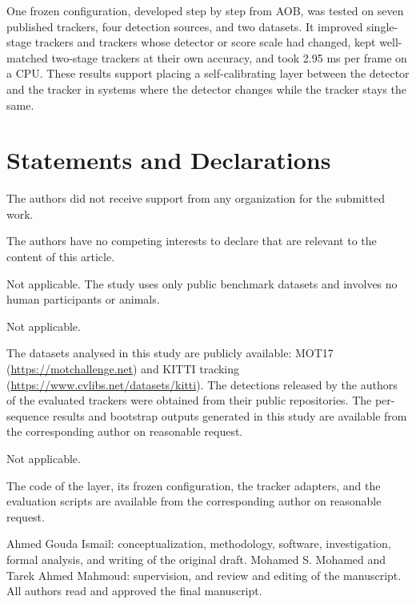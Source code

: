 \documentclass[pdflatex,referee,sn-mathphys-num]{sn-jnl}
\newcommand{\aob}{AOB}
\begin{document}
One frozen configuration, developed step by step from \aob{}, was tested on
seven published trackers, four detection sources, and two datasets. It
improved single-stage trackers and trackers whose detector or score scale had
changed, kept well-matched two-stage trackers at their own accuracy, and took
2.95 ms per frame on a CPU. These results support placing a self-calibrating
layer between the detector and the tracker in systems where the detector
changes while the tracker stays the same.

\backmatter

\section*{Statements and Declarations}

The authors did not receive support from any organization for the submitted work.

The authors have no competing interests to declare that are relevant to the content of this
article.

Not applicable. The study uses only public benchmark datasets and involves no human participants
or animals.

Not applicable.

The datasets analysed in this study are publicly available: MOT17
(\url{https://motchallenge.net}) and KITTI tracking (\url{https://www.cvlibs.net/datasets/kitti}).
The detections released by the authors of the evaluated trackers were obtained from their public
repositories. The per-sequence results and bootstrap outputs generated in this study are available
from the corresponding author on reasonable request.

Not applicable.

The code of the layer, its frozen configuration, the tracker adapters, and the evaluation scripts
are available from the corresponding author on reasonable request.

Ahmed Gouda Ismail: conceptualization, methodology, software, investigation, formal analysis, and
writing of the original draft. Mohamed S. Mohamed and Tarek Ahmed Mahmoud: supervision, and
review and editing of the manuscript. All authors read and approved the final manuscript.

\end{document}
